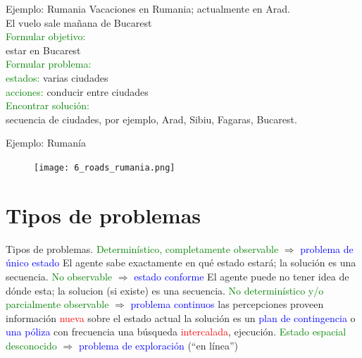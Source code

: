 \documentclass{beamer}
\theoremstyle{definition}
\theoremstyle{theorem}
\theoremstyle{remark}
\begin{document}

\begin{frame}{Ejemplo: Rumania}
    Vacaciones en Rumania; actualmente en Arad.\\
    El vuelo sale mañana de Bucarest\\
    \textcolor{Green}{Formular objetivo:}\\
    \hspace{0.8cm}estar en Bucarest\\
    \textcolor{Green}{Formular problema:}\\
    \hspace{0.8cm}\textcolor{Green}{estados:} varias ciudades\\
    \hspace{0.8cm}\textcolor{Green}{acciones:} conducir entre ciudades\\
    \textcolor{Green}{Encontrar solución:}\\
    \hspace{0.8cm}secuencia de ciudades, por ejemplo, Arad, Sibiu, Fagaras, Bucarest.
\end{frame}


\begin{frame}{Ejemplo: Rumanía}
    \begin{figure}
        \texttt{[image: 6\_roads\_rumania.png]}
    \end{figure}
\end{frame}


\section{Tipos de problemas}%

\begin{frame}{Tipos de problemas.}
    \textcolor{green}{Determinístico, completamente observable} $\Rightarrow$ \textcolor{blue}{problema de único estado} \newline
    \blank{1cm}El agente sabe exactamente en qué estado estará; la solución es una secuencia.
    \newline
    \textcolor{green}{No observable} $\Rightarrow$ \textcolor{blue}{estado conforme} \newline
    \blank{1cm}El agente puede no tener idea de dónde esta; la solucion (si existe) es una secuencia.
    \newline
    \textcolor{green}{No determinístico y/o parcialmente observable} $\Rightarrow$ \textcolor{blue}{problema continuos} \newline
    \blank{1cm}las percepciones proveen información \textcolor{red}{nueva} sobre el estado actual\newline
    \blank{1cm}la solución es un \textcolor{blue}{plan de contingencia} o \textcolor{blue}{una póliza}\newline
    \blank{1cm}con frecuencia una búsqueda \textcolor{red}{intercalada}, ejecución.\newlin
    \newline
    \textcolor{green}{Estado espacial desconocido} $\Rightarrow$ \textcolor{blue}{problema de exploración} (“en línea”)
\end{frame}
\end{document}
